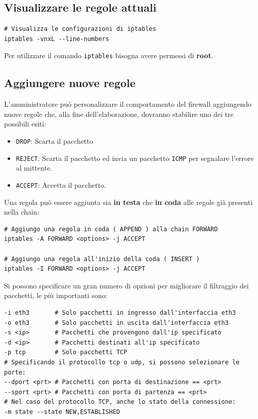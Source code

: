 \documentclass[a4paper]{report}
\newenvironment{ricordati}{\begin{tcolorbox}[fonttitle=\sffamily\bfseries\large,title=Ricordati,colframe=orange!75!white]}{\end{tcolorbox}}
\newenvironment{code}{\begin{tcolorbox}[size=small]}{\end{tcolorbox}}
\begin{document}
\subsection{Visualizzare le regole attuali}

\begin{code}
\begin{lstlisting}
# Visualizza le configurazioni di iptables
iptables -vnxL --line-numbers
\end{lstlisting}
\end{code}

\begin{ricordati}
	Per utilizzare il comando \texttt{iptables} bisogna avere permessi di \textbf{root}.
\end{ricordati}

\subsection{Aggiungere nuove regole}

L'amministratore può personalizzare il comportamento del firewall aggiungendo nuove regole che, alla fine dell'elaborazione, dovranno stabilire uno dei tre possibili esiti:

\begin{itemize}
	\item \texttt{DROP}: Scarta il pacchetto
	\item \texttt{REJECT}: Scarta il pacchetto ed invia un pacchetto \texttt{ICMP} per segnalare l'errore al mittente.
	\item \texttt{ACCEPT}: Accetta il pacchetto.
\end{itemize}

Una regola può essere aggiunta sia \textbf{in testa} che \textbf{in coda} alle regole già presenti nella chain:

\begin{code}
\begin{lstlisting}
# Aggiungo una regola in coda ( APPEND ) alla chain FORWARD
iptables -A FORWARD <options> -j ACCEPT

# Aggiungo una regola all'inizio della coda ( INSERT )
iptables -I FORWARD <options> -j ACCEPT
\end{lstlisting}
\end{code}

Si possono specificare un gran numero di opzioni per migliorare il filtraggio dei pacchetti, le più importanti sono:

\begin{code}
\begin{lstlisting}
-i eth3       # Solo pacchetti in ingresso dall'interfaccia eth3
-o eth3       # Solo pacchetti in uscita dall'interfaccia eth3
-s <ip>       # Pacchetti che provengono dall'ip specificato
-d <ip>       # Pacchetti destinati all'ip specificato
-p tcp        # Solo pacchetti TCP
# Specificando il protocollo tcp o udp, si possono selezionare le porte:
--dport <prt> # Pacchetti con porta di destinazione == <prt>
--sport <prt> # Pacchetti con porta di partenza == <prt>
# Nel caso del protocollo TCP, anche lo stato della connessione:
-m state --state NEW,ESTABLISHED
\end{lstlisting}
\end{code}
\end{document}
